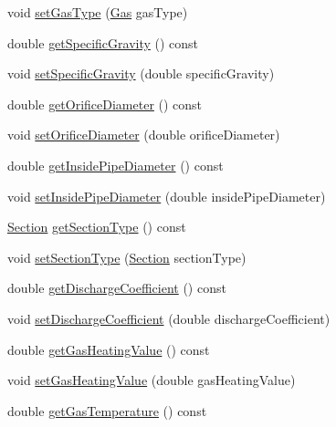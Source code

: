 \begin{DoxyCompactItemize}
\item 
void \hyperlink{class_flow_calculations_energy_use_a01b38762426c50e6ab22aefd674f30df}{set\+Gas\+Type} (\hyperlink{class_flow_calculations_energy_use_a840d5a836e7b05d6791b79bace4440f2}{Gas} gas\+Type)
\item 
double \hyperlink{class_flow_calculations_energy_use_adc3ac2406e00a75c33be0a6a66153da3}{get\+Specific\+Gravity} () const
\item 
void \hyperlink{class_flow_calculations_energy_use_abafa34d337124a1487fb0c871ea8a24a}{set\+Specific\+Gravity} (double specific\+Gravity)
\item 
double \hyperlink{class_flow_calculations_energy_use_a71c34f09ec3524db321b8934930700c5}{get\+Orifice\+Diameter} () const
\item 
void \hyperlink{class_flow_calculations_energy_use_a31116dc6381ad3fd9d2214da7ee3dd1b}{set\+Orifice\+Diameter} (double orifice\+Diameter)
\item 
double \hyperlink{class_flow_calculations_energy_use_a9042dce2938208358fe38ed8a726ca65}{get\+Inside\+Pipe\+Diameter} () const
\item 
void \hyperlink{class_flow_calculations_energy_use_a616486580460b616a7a8c4935119cd6c}{set\+Inside\+Pipe\+Diameter} (double inside\+Pipe\+Diameter)
\item 
\hyperlink{class_flow_calculations_energy_use_afbabab0da698748de91369a5dfc7662a}{Section} \hyperlink{class_flow_calculations_energy_use_ae88cc4f93028907c4c12e8925f63266b}{get\+Section\+Type} () const
\item 
void \hyperlink{class_flow_calculations_energy_use_add93257048914dbd920b6dc2be431b69}{set\+Section\+Type} (\hyperlink{class_flow_calculations_energy_use_afbabab0da698748de91369a5dfc7662a}{Section} section\+Type)
\item 
double \hyperlink{class_flow_calculations_energy_use_a28033765df3a220b5c7d75e34fd95c43}{get\+Discharge\+Coefficient} () const
\item 
void \hyperlink{class_flow_calculations_energy_use_aaa0b642f4cb22b3b74acd8a5d473a107}{set\+Discharge\+Coefficient} (double discharge\+Coefficient)
\item 
double \hyperlink{class_flow_calculations_energy_use_a42818c3f03cc70967eb6bb24094530a1}{get\+Gas\+Heating\+Value} () const
\item 
void \hyperlink{class_flow_calculations_energy_use_ae51a954fb1f44d6b114f66e69bdf754e}{set\+Gas\+Heating\+Value} (double gas\+Heating\+Value)
\item 
double \hyperlink{class_flow_calculations_energy_use_a9d5782d594530c0345ac3c8faff252b3}{get\+Gas\+Temperature} () const

\end{DoxyCompactItemize}
